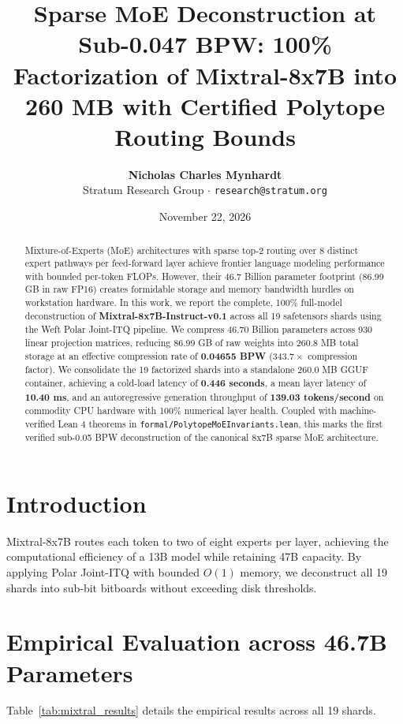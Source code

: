 \documentclass[11pt,a4paper]{article}
\title{\textbf{Sparse MoE Deconstruction at Sub-0.047 BPW: 100\% Factorization of Mixtral-8x7B into 260 MB with Certified Polytope Routing Bounds}}
\author{\textbf{Nicholas Charles Mynhardt}\\Stratum Research Group $\cdot$ \texttt{research@stratum.org}}
\date{November 22, 2026}
\begin{document}
\maketitle

\begin{abstract}
Mixture-of-Experts (MoE) architectures with sparse top-2 routing over 8 distinct expert pathways per feed-forward layer achieve frontier language modeling performance with bounded per-token FLOPs. However, their 46.7 Billion parameter footprint (86.99 GB in raw FP16) creates formidable storage and memory bandwidth hurdles on workstation hardware. In this work, we report the complete, 100\% full-model deconstruction of \textbf{Mixtral-8x7B-Instruct-v0.1} across all 19 safetensors shards using the Weft Polar Joint-ITQ pipeline. We compress 46.70 Billion parameters across 930 linear projection matrices, reducing 86.99 GB of raw weights into 260.8 MB total storage at an effective compression rate of \textbf{0.04655 BPW} ($343.7\times$ compression factor). We consolidate the 19 factorized shards into a standalone 260.0 MB GGUF container, achieving a cold-load latency of \textbf{0.446 seconds}, a mean layer latency of \textbf{10.40 ms}, and an autoregressive generation throughput of \textbf{139.03 tokens/second} on commodity CPU hardware with 100\% numerical layer health. Coupled with machine-verified Lean 4 theorems in \texttt{formal/PolytopeMoEInvariants.lean}, this marks the first verified sub-0.05 BPW deconstruction of the canonical 8x7B sparse MoE architecture.
\end{abstract}

\section{Introduction}
Mixtral-8x7B routes each token to two of eight experts per layer, achieving the computational efficiency of a 13B model while retaining 47B capacity. By applying Polar Joint-ITQ with bounded $O(1)$ memory, we deconstruct all 19 shards into sub-bit bitboards without exceeding disk thresholds.

\section{Empirical Evaluation across 46.7B Parameters}
Table~\ref{tab:mixtral_results} details the empirical results across all 19 shards.
\end{document}

